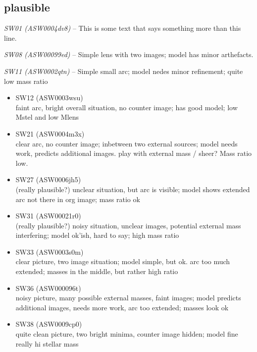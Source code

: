 \documentclass[fleqn,usenatbib]{mnras}
\newcommand{\lenstitle}[1]{\noindent\textit{#1} --}
\begin{document}
\subsection{plausible}

\lenstitle{SW01 (ASW0004dv8)}
  This is some text that says something more than this line.

\lenstitle{SW08 (ASW00099ed)}
  Simple lens with two images;
  model has minor arthefacts.

\lenstitle{SW11 (ASW0002qtn)}
  Simple small arc;
  model nedes minor refinement;
  quite low mass ratio
  
\begin{itemize}
  \item SW12 (ASW0003wsu) \\
  faint arc, bright overall situation, no counter image;
  has good model;
  low Mstel and low Mlens
  
  \item SW21 (ASW0004m3x) \\
  clear arc, no counter image; inbetween two external sources;
  model needs work, predicts additional images. play with external mass / sheer?
  Mass ratio low.
  
  \item SW27 (ASW0006jh5) \\
  (really plausible?)
  unclear situation, but arc is visible;
  model shows extended arc not there in org image;
  mass ratio ok
  
  \item SW31 (ASW00021r0) \\
  (really plausible?)
  noisy situation, unclear images, potential external mass interfering;
  model ok'ish, hard to say;
  high mass ratio
  
  \item SW33 (ASW0003s0m)\\
  clear picture, two image situation;
  model simple, but ok. arc too much extended;
  masses in the middle, but rather high ratio
  
  \item SW36 (ASW000096t) \\
  noisy picture, many possible external masses, faint images;
  model predicts additional images, needs more work, arc too extended;
  masses look ok
  
  \item SW38 (ASW0009cp0) \\
  quite clean picture, two bright minima, counter image hidden;
  model fine
  really hi stellar mass
  

\end{itemize}
\end{document}
